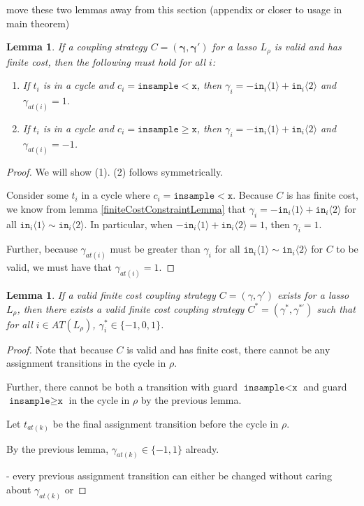 \documentclass[12pt]{article}
\newcommand{\gguard}[1][x]{\texttt{insample}\geq #1}
\newcommand{\lguard}[1][x]{\texttt{insample} < #1}
\newcommand{\brangle}[1]{\langle #1 \rangle}
\newtheorem{lemma}[thm]{Lemma}
\theoremstyle{definition}
\begin{document}
{\color{red} move these two lemmas away from this section (appendix or closer to usage in main theorem)}

\begin{lemma}\label{cycleGammaConstraints}
    If a coupling strategy $C=(\mathbf{\gamma}, \mathbf{\gamma}')$ for a lasso $L_\rho$ is valid and has finite cost, then the following must hold for all $i$:
    \begin{enumerate}
        \item If $t_i$ is in a cycle and $c_i = \lguard[\texttt{x}]$, then $\gamma_i = -\texttt{in}_i\brangle{1}+\texttt{in}_i\brangle{2}$ and $\gamma_{at(i)} = 1$.
        \item If $t_i$ is in a cycle and $c_i = \gguard[\texttt{x}]$, then $\gamma_i = -\texttt{in}_i\brangle{1}+\texttt{in}_i\brangle{2}$ and $\gamma_{at(i)} = -1$.
    \end{enumerate}
\end{lemma}
\begin{proof}
    We will show (1). (2) follows symmetrically.

    Consider some $t_i$ in a cycle where $c_i = \lguard[\texttt{x}]$. Because $C$ is has finite cost, we know from lemma \ref{finiteCostConstraintLemma} that $\gamma_i = -\texttt{in}_i\brangle{1}+\texttt{in}_i\brangle{2}$ for all  $\texttt{in}_i\brangle{1}\sim\texttt{in}_i\brangle{2}$. In particular, when $-\texttt{in}_i\brangle{1}+\texttt{in}_i\brangle{2}=1$, then $\gamma_i=1$. 
    
    Further, because $\gamma_{at(i)}$ must be greater than $\gamma_i$ for all $\texttt{in}_i\brangle{1}\sim\texttt{in}_i\brangle{2}$ for $C$ to be valid, we must have that $\gamma_{at(i)}=1$.
\end{proof}
\begin{lemma}
    If a valid finite cost coupling strategy $C = (\gamma, \gamma')$ exists for a lasso $L_\rho$, then there exists a valid finite cost coupling strategy $C^*= (\gamma^*, \gamma^{*\prime})$ such that for all $i\in AT(L_\rho)$, $\gamma_i^*\in \{-1, 0, 1\}$. 
\end{lemma}
\begin{proof}
    Note that because $C$ is valid and has finite cost, there cannot be any assignment transitions in the cycle in $\rho$. 

    Further, there cannot be both a transition with guard $\lguard[\texttt{x}]$ and guard $\gguard[\texttt{x}]$ in the cycle in $\rho$ by the previous lemma. 

    Let $t_{at(k)}$ be the final assignment transition before the cycle in $\rho$. 

    By the previous lemma, $\gamma_{at(k)} \in \{-1, 1\}$ already. 

    - every previous assignment transition can either be changed without caring about $\gamma_{at(k)}$ or 

\end{proof}
\end{document}

